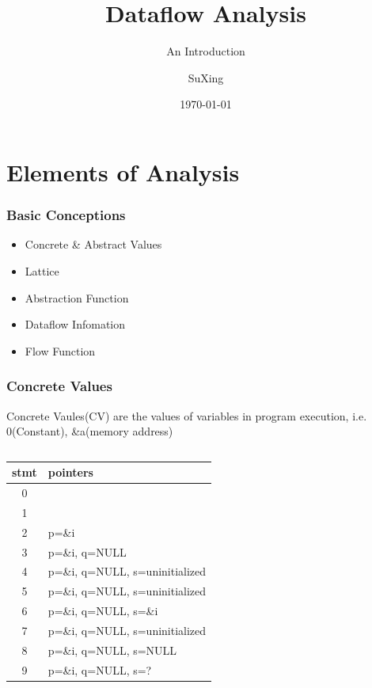 \documentclass[]{beamer}
\title{Dataflow Analysis}
\subtitle{An Introduction}
\author[SuXing~pysuxing@gmail.com]{SuXing}
\institute{TOW}
\date{\today}
\begin{document}
\setlength{\parindent}{0pt}

\frame{\titlepage}
\frame{\tableofcontents}

\section{Elements of Analysis}
\frame{\tableofcontents[currentsection]}

\begin{frame}
  \frametitle{Basic Conceptions}
  \begin{itemize}
    \item Concrete \& Abstract Values
    \item Lattice
    \item Abstraction Function
    \item Dataflow Infomation
    \item Flow Function
  \end{itemize}
\end{frame}

\begin{frame}
  \frametitle{Concrete Values}
  \alert{Concrete Vaules(CV)} are the values of variables in program execution,
  i.e. 0(Constant), \&a(memory address)

  \vspace{.5em}\pause
  \begin{columns}
    \begin{column}{.65\textwidth}
      \begin{tabular}{c|l}
        stmt & pointers\\
        \hline
        0 &  \\
        1 &  \\
        2 & p=\&i \\
        3 & p=\&i, q=NULL \\
        4 & p=\&i, q=NULL, s=uninitialized \\
        5 & p=\&i, q=NULL, s=uninitialized \\
        6 & p=\&i, q=NULL, s=\&i \\
        7 & p=\&i, q=NULL, s=uninitialized \\
        8 & p=\&i, q=NULL, s=NULL \\
        9 & p=\&i, q=NULL, s=?
      \end{tabular}
    \end{column}
    \begin{column}{.35\textwidth}
      
    \end{column}
  \end{columns}
\end{frame}
\end{document}
